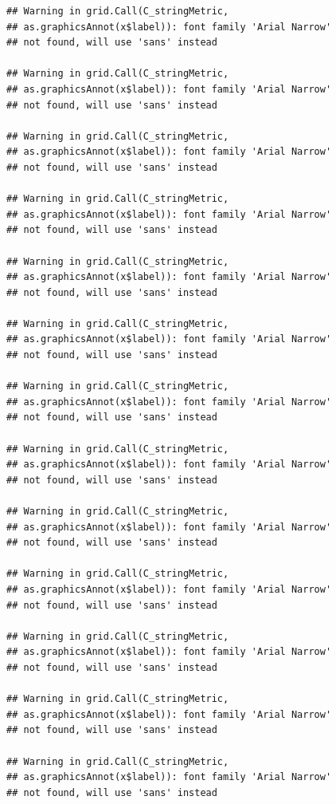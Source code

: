 \documentclass[]{krantz}
\begin{document}
\begin{verbatim}
## Warning in grid.Call(C_stringMetric,
## as.graphicsAnnot(x$label)): font family 'Arial Narrow'
## not found, will use 'sans' instead

## Warning in grid.Call(C_stringMetric,
## as.graphicsAnnot(x$label)): font family 'Arial Narrow'
## not found, will use 'sans' instead

## Warning in grid.Call(C_stringMetric,
## as.graphicsAnnot(x$label)): font family 'Arial Narrow'
## not found, will use 'sans' instead

## Warning in grid.Call(C_stringMetric,
## as.graphicsAnnot(x$label)): font family 'Arial Narrow'
## not found, will use 'sans' instead

## Warning in grid.Call(C_stringMetric,
## as.graphicsAnnot(x$label)): font family 'Arial Narrow'
## not found, will use 'sans' instead

## Warning in grid.Call(C_stringMetric,
## as.graphicsAnnot(x$label)): font family 'Arial Narrow'
## not found, will use 'sans' instead

## Warning in grid.Call(C_stringMetric,
## as.graphicsAnnot(x$label)): font family 'Arial Narrow'
## not found, will use 'sans' instead

## Warning in grid.Call(C_stringMetric,
## as.graphicsAnnot(x$label)): font family 'Arial Narrow'
## not found, will use 'sans' instead

## Warning in grid.Call(C_stringMetric,
## as.graphicsAnnot(x$label)): font family 'Arial Narrow'
## not found, will use 'sans' instead

## Warning in grid.Call(C_stringMetric,
## as.graphicsAnnot(x$label)): font family 'Arial Narrow'
## not found, will use 'sans' instead

## Warning in grid.Call(C_stringMetric,
## as.graphicsAnnot(x$label)): font family 'Arial Narrow'
## not found, will use 'sans' instead

## Warning in grid.Call(C_stringMetric,
## as.graphicsAnnot(x$label)): font family 'Arial Narrow'
## not found, will use 'sans' instead

## Warning in grid.Call(C_stringMetric,
## as.graphicsAnnot(x$label)): font family 'Arial Narrow'
## not found, will use 'sans' instead
\end{verbatim}
\end{document}
